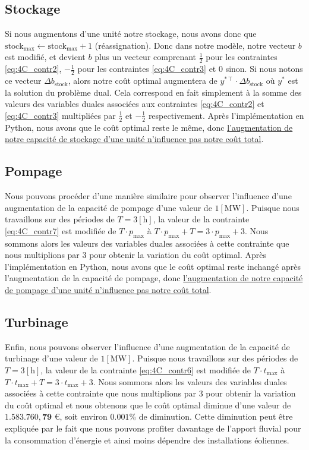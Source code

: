 \documentclass{article}
\newcommand{\unit}[1]{[\mathrm{#1}]}
\begin{document}
\subsection*{Stockage}
Si nous augmentons d'une unité notre stockage, nous avons donc que $\mathrm{stock}_\mathrm{max} \leftarrow \mathrm{stock}_\mathrm{max} + 1$ (réassignation). Donc dans notre modèle,
notre vecteur $b$ est modifié, et devient $b$ plus un vecteur comprenant $\frac{1}{2}$ pour les contraintes 
\eqref{eq:4C_contr2}, $-\frac{1}{2}$ pour les contraintes \eqref{eq:4C_contr3} et 0 sinon. Si nous notons ce vecteur $\Delta b_{\mathrm{stock}}$, alors notre coût optimal augmentera de
$y^{* \intercal}\cdot \Delta b_{\mathrm{stock}}$ où $y^{*}$ est la solution du problème dual. Cela correspond en fait simplement à la somme des valeurs des variables duales associées aux contraintes
\eqref{eq:4C_contr2} et \eqref{eq:4C_contr3} multipliées par $\frac{1}{2}$ et $-\frac{1}{2}$ respectivement. Après l'implémentation en Python, nous avons que le coût optimal reste le même, donc \underline{l'augmentation de notre capacité de stockage d'une unité n'influence pas notre coût total}.

\subsection*{Pompage}
Nous pouvons procéder d'une manière similaire pour observer l'influence d'une augmentation de la capacité de pompage d'une valeur de $1 \unit{MW}$.
Puisque nous travaillons sur des périodes de $T = 3 \unit{h}$, la valeur de la contrainte \eqref{eq:4C_contr7} est modifiée de $T \cdot p_\mathrm{max}$ à $T \cdot p_\mathrm{max} + T = 3 \cdot p_\mathrm{max} + 3 $. 
Nous sommons alors les valeurs des variables duales associées à cette contrainte que nous multiplions par $3$ pour obtenir la variation du coût optimal. 
Après l'implémentation en Python, nous avons que le coût optimal reste inchangé après l'augmentation de la capacité de pompage, donc \underline{l'augmentation de notre capacité de pompage d'une unité n'influence pas notre coût total}.

\subsection*{Turbinage}
Enfin, nous pouvons observer l'influence d'une augmentation de la capacité de turbinage d'une valeur de $1 \unit{MW}$.
Puisque nous travaillons sur des périodes de $T = 3 \unit{h}$, la valeur de la contrainte \eqref{eq:4C_contr6} est modifiée de $T \cdot t_\mathrm{max}$ à $T \cdot t_\mathrm{max} + T = 3 \cdot t_\mathrm{max} + 3 $.
Nous sommons alors les valeurs des variables duales associées à cette contrainte que nous multiplions par $3$ pour obtenir la variation du coût optimal 
et nous obtenons que le coût optimal diminue d'une valeur de $\mathbf{1.583.760,79}$ \euro, soit environ $0.001$\% de diminution. Cette diminution peut être expliquée par le fait que nous pouvons profiter davantage de l'apport fluvial pour la consommation d'énergie et ainsi moins dépendre des installations éoliennes.\\ 
\end{document}
